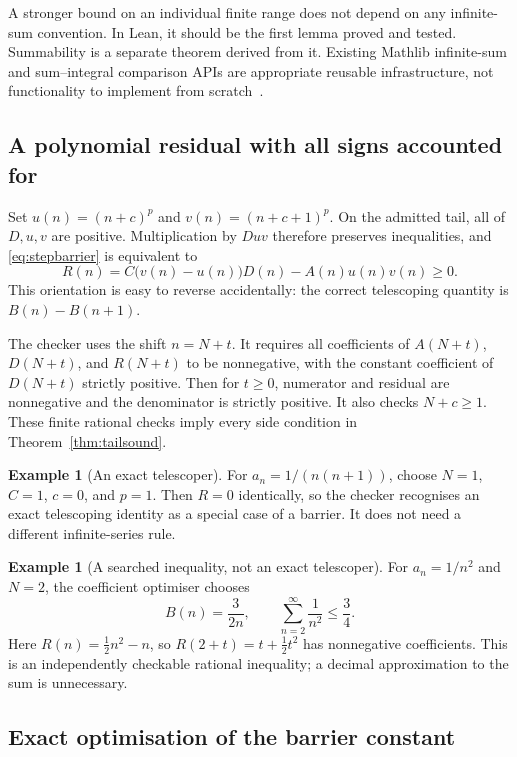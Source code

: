 \documentclass[11pt,a4paper]{article}
\theoremstyle{definition}\newtheorem{definition}[theorem]{Definition}
\newtheorem{example}[theorem]{Example}
\begin{document}
A stronger bound on an individual finite range does not depend on any
infinite-sum convention. In Lean, it should be the first lemma proved and tested.
Summability is a separate theorem derived from it. Existing Mathlib infinite-sum
and sum--integral comparison APIs are appropriate reusable infrastructure,
not functionality to implement from scratch~\cite{mathlib-infinitesum,mathlib-sumintegral}.

\subsection{A polynomial residual with all signs accounted for}

Set $u(n)=(n+c)^p$ and $v(n)=(n+c+1)^p$. On the admitted tail, all of $D,u,v$
are positive. Multiplication by $Duv$ therefore preserves inequalities, and
\eqref{eq:stepbarrier} is equivalent to
\begin{equation}\label{eq:residual}
 R(n)=C\bigl(v(n)-u(n)\bigr)D(n)-A(n)u(n)v(n)\ge0.
\end{equation}
This orientation is easy to reverse accidentally: the correct telescoping
quantity is $B(n)-B(n+1)$.

The checker uses the shift $n=N+t$. It requires all coefficients of
$A(N+t)$, $D(N+t)$, and $R(N+t)$ to be nonnegative, with the constant
coefficient of $D(N+t)$ strictly positive. Then for $t\ge0$, numerator and
residual are nonnegative and the denominator is strictly positive. It also
checks $N+c\ge1$. These finite rational checks imply every side condition in
Theorem~\ref{thm:tailsound}.

\begin{example}[An exact telescoper]
For $a_n=1/(n(n+1))$, choose $N=1$, $C=1$, $c=0$, and $p=1$. Then
$R=0$ identically, so the checker recognises an exact telescoping identity as a
special case of a barrier. It does not need a different infinite-series rule.
\end{example}

\begin{example}[A searched inequality, not an exact telescoper]
For $a_n=1/n^2$ and $N=2$, the coefficient optimiser chooses
\[
 B(n)=\frac{3}{2n},\qquad \sum_{n=2}^{\infty}\frac1{n^2}\le\frac34.
\]
Here $R(n)=\tfrac12n^2-n$, so $R(2+t)=t+\tfrac12t^2$ has nonnegative
coefficients. This is an independently checkable rational inequality; a decimal
approximation to the sum is unnecessary.
\end{example}

\subsection{Exact optimisation of the barrier constant}
\end{document}
